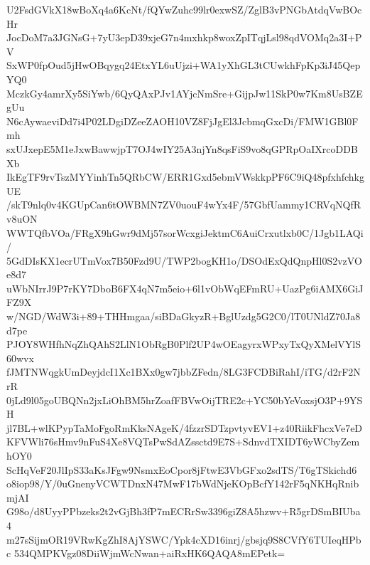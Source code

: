 U2FsdGVkX18wBoXq4a6KcNt/fQYwZuhc99lr0exwSZ/ZglB3vPNGbAtdqVwBOcHr
JocDoM7a3JGNsG+7yU3epD39xjeG7n4mxhkp8woxZpITqjLsl98qdVOMq2a3I+PV
SxWP0fpOud5jHwOBqygq24EtxYL6uUjzi+WA1yXhGL3tCUwkhFpKp3iJ45QepYQ0
MczkGy4amrXy5SiYwb/6QyQAxPJv1AYjcNmSre+GijpJw11SkP0w7Km8UsBZEgUu
N6cAywaeviDd7i4P02LDgiDZeeZAOH10VZ8FjJgEl3JcbmqGxcDi/FMW1GBl0Fmh
sxUJxepE5M1eJxwBawwjpT7OJ4wIY25A3njYn8qsFiS9vo8qGPRpOaIXrcoDDBXb
IkEgTF9rvTszMYYinhTn5QRbCW/ERR1Gxd5ebmVWskkpPF6C9iQ48pfxhfchkgUE
/skT9nlq0v4KGUpCan6tOWBMN7ZV0uouF4wYx4F/57GbfUammy1CRVqNQfRv8uON
WWTQfbVOa/FRgX9hGwr9dMj57sorWcxgiJektmC6AuiCrxutlxb0C/1Jgb1LAQi/
5GdDIsKX1ecrUTmVox7B50Fzd9U/TWP2bogKH1o/DSOdExQdQnpHl0S2vzVOe8d7
uWbNIrrJ9P7rKY7DboB6FX4qN7m5eio+6l1vObWqEFmRU+UazPg6iAMX6GiJFZ9X
w/NGD/WdW3i+89+THHmgaa/siBDaGkyzR+BglUzdg5G2C0/lT0UNldZ70Ja8d7pe
PJOY8WHfhNqZhQAhS2LlN1ObRgB0Plf2UP4wOEagyrxWPxyTxQyXMelVYlS60wvx
fJMTNWqgkUmDeyjdcI1Xc1BXx0gw7jbbZFedn/8LG3FCDBiRahI/iTG/d2rF2NrR
0jLd9l05goUBQNn2jxLiOhBM5hrZoafFBVwOijTRE2c+YC50bYeVoxsjO3P+9YSH
jl7BL+wlKPypTaMoFgoRmKksNAgeK/4fzzrSDTzpvtyvEV1+z40RiikFhcxVe7eD
KFVWli76sHmv9nFuS4Xe8VQTsPwSdAZssctd9E7S+SdnvdTXIDT6yWCbyZemhOY0
ScHqVeF20JlIpS33aKsJFgw9NsmxEoCpor8jFtwE3VbGFxo2sdTS/T6gTSkichd6
o8iop98/Y/0uGnenyVCWTDnxN47MwF17bWdNjeKOpBcfY142rF5qNKHqRnibmjAI
G98o/d8UyyPPbzeks2t2vGjBh3fP7mECRrSw3396giZ8A5hzwv+R5grDSmBIUba4
m27sSijmOR19VRwKgZhI8AjYSWC/Ypk4cXD16inrj/gbsjq9S8CVfY6TUIeqHPbc
534QMPKVgz08DiiWjmWcNwan+aiRxHK6QAQA8mEPetk=
